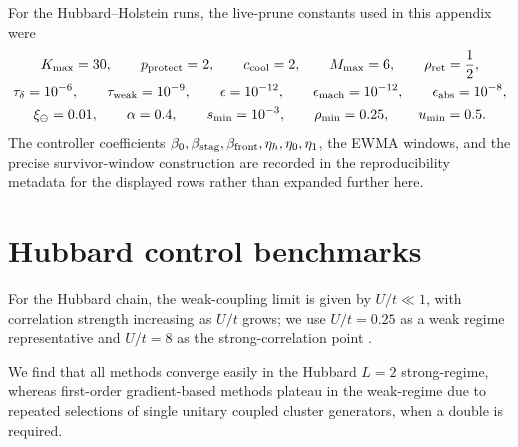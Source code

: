 \documentclass[
  reprint,
  amsmath,
  amssymb,
  aps,
  pra,
  nofootinbib,
  superscriptaddress,
  floatfix
]{revtex4-2}
\begin{document}
For the Hubbard--Holstein runs, the live-prune constants used in this appendix were
\[
\begin{gathered}
K_{\max}=30,\qquad
p_{\rm protect}=2,\qquad
c_{\rm cool}=2,\qquad
M_{\max}=6,\qquad
\rho_{\rm ret}=\frac12,
\\
\tau_\delta=10^{-6},\qquad
\tau_{\rm weak}=10^{-9},\qquad
\epsilon=10^{-12},\qquad
\epsilon_{\rm mach}=10^{-12},\qquad
\epsilon_{\rm abs}=10^{-8},
\\
\xi_\ominus=0.01,\qquad
\alpha=0.4,\qquad
s_{\min}=10^{-3},\qquad
\rho_{\min}=0.25,\qquad
u_{\min}=0.5 .
\end{gathered}
\]
The controller coefficients \(\beta_0,\beta_{\rm stag},\beta_{\rm front},\eta_h,\eta_0,\eta_1\), the EWMA windows, and the precise survivor-window construction are recorded in the reproducibility metadata for the displayed rows rather than expanded further here.

\section{Hubbard control benchmarks}

For the Hubbard chain, the weak-coupling limit is given by
\(U/t\ll 1\), with correlation strength increasing as \(U/t\) grows;
we use \(U/t=0.25\) as a weak regime representative and \(U/t=8\) as the strong-correlation point
\cite{Arovas2022Hubbard}.  

We find that all methods converge easily in the Hubbard $L=2$ strong-regime, whereas first-order gradient-based methods plateau in the weak-regime due to repeated selections of single unitary coupled cluster generators, when a double is required. 
\end{document}
